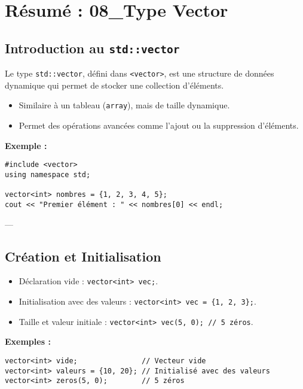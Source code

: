 \section{ Résumé : 08\_Type Vector}

\subsection{ Introduction au \texttt{std::vector}}
Le type \texttt{std::vector}, défini dans \texttt{<vector>}, est une structure de données dynamique qui permet de stocker une collection d'éléments.
\begin{itemize}
    \item Similaire à un tableau (\texttt{array}), mais de taille dynamique.
    \item Permet des opérations avancées comme l'ajout ou la suppression d'éléments.
\end{itemize}

\textbf{Exemple :}
\begin{tcolorbox}[colframe=blue!50!black, colback=blue!5!white, title=Exemple de std::vector]
\begin{verbatim}
#include <vector>
using namespace std;

vector<int> nombres = {1, 2, 3, 4, 5};
cout << "Premier élément : " << nombres[0] << endl;
\end{verbatim}
\end{tcolorbox}

---

\subsection{ Création et Initialisation}
\begin{itemize}
    \item Déclaration vide : \texttt{vector<int> vec;}.
    \item Initialisation avec des valeurs : \texttt{vector<int> vec = \{1, 2, 3\};}.
    \item Taille et valeur initiale : \texttt{vector<int> vec(5, 0); // 5 zéros}.
\end{itemize}

\textbf{Exemples :}
\begin{tcolorbox}[colframe=blue!50!black, colback=blue!5!white, title=Exemple de Création et Initialisation]
\begin{verbatim}
vector<int> vide;               // Vecteur vide
vector<int> valeurs = {10, 20}; // Initialisé avec des valeurs
vector<int> zeros(5, 0);        // 5 zéros
\end{verbatim}
\end{tcolorbox}

